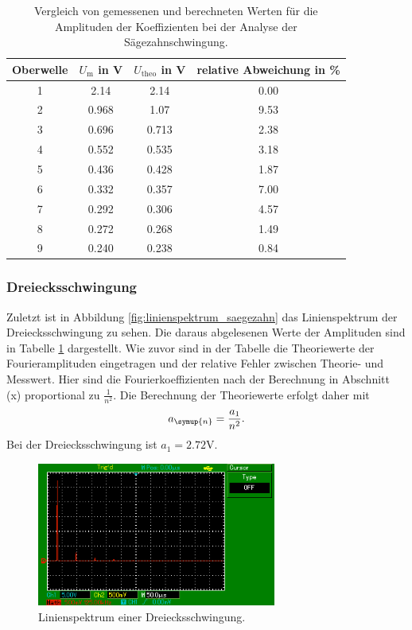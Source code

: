 \begin{table}
  \centering
  \begin{tabular}{c c c c}
    \toprule
    Oberwelle & $U_\text{m}$ in \si{\volt} & $U_\text{theo}$ in \si{\volt} &
    relative Abweichung in \% \\
    \midrule
    1 & 2.14  & 2.14  & 0.00 \\
    2 & 0.968 & 1.07  & 9.53 \\
    3 & 0.696 & 0.713 & 2.38 \\
    4 & 0.552 & 0.535 & 3.18 \\
    5 & 0.436 & 0.428 & 1.87 \\
    6 & 0.332 & 0.357 & 7.00 \\
    7 & 0.292 & 0.306 & 4.57 \\
    8 & 0.272 & 0.268 & 1.49 \\
    9 & 0.240 & 0.238 & 0.84 \\
    \bottomrule
  \end{tabular}
  \caption{Vergleich von gemessenen und berechneten Werten für die Amplituden
    der Koeffizienten bei der Analyse der Sägezahnschwingung.}
  \label{tab:analyse_saegezahn}
\end{table}

\newpage
\subsubsection{Dreiecksschwingung}
Zuletzt ist in Abbildung \ref{fig:linienspektrum_saegezahn} das Linienspektrum der
Dreiecksschwingung zu sehen. Die daraus abgelesenen Werte der Amplituden sind in
Tabelle \ref{tab:analyse_saegezahn} dargestellt. Wie zuvor sind in der Tabelle
die Theoriewerte der Fourieramplituden eingetragen und der relative Fehler
zwischen Theorie- und Messwert.
Hier sind die Fourierkoeffizienten nach der Berechnung in Abschnitt (x) proportional
zu $\frac{1}{n^2}$. Die Berechnung der Theoriewerte erfolgt daher mit
\begin{equation}
  a_\symup{n} = \frac{a_1}{n^2}.
  \label{eqn:a_n_dreieck}
\end{equation}
Bei der Dreiecksschwingung ist $a_1 = 2.72 \si{\volt}$.

\begin{figure}
  \centering
  \includegraphics[width=0.7\textwidth]{linienspektrum_dreieck.png}
  \caption{Linienspektrum einer Dreiecksschwingung.}
  \label{fig:linienspektrum_dreieck}
\end{figure}

